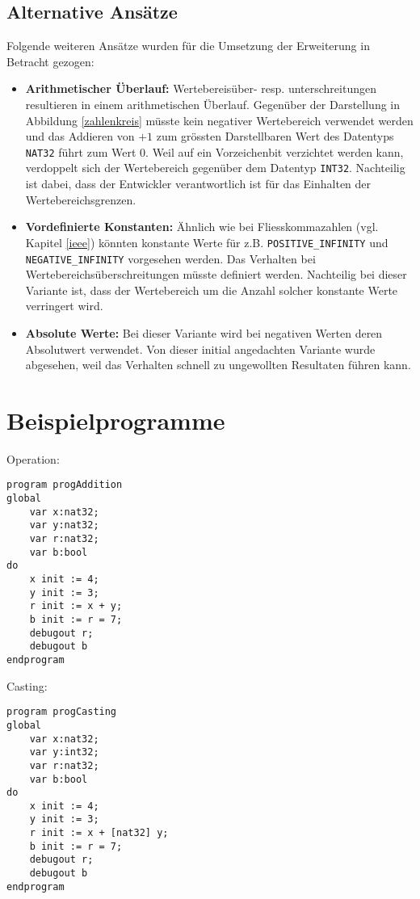 \documentclass[10pt, a4paper, twocolumn]{article} %
\begin{document}
\subsection{Alternative Ansätze}
Folgende weiteren Ansätze wurden für die Umsetzung der Erweiterung in Betracht gezogen:

\begin{itemize}
    \item \textbf{Arithmetischer Überlauf:} Wertebereisüber- resp. unterschreitungen resultieren in einem arithmetischen Überlauf. Gegenüber der Darstellung in Abbildung \ref{zahlenkreis} müsste kein negativer Wertebereich verwendet werden und das Addieren von $+ 1$ zum grössten Darstellbaren Wert des Datentyps \texttt{NAT32} führt zum Wert $0$. Weil auf ein Vorzeichenbit verzichtet werden kann, verdoppelt sich der Wertebereich gegenüber dem Datentyp \texttt{INT32}. Nachteilig ist dabei, dass der Entwickler verantwortlich ist für das Einhalten der Wertebereichsgrenzen.
    \item \textbf{Vordefinierte Konstanten:} Ähnlich wie bei Fliesskommazahlen (vgl. Kapitel \ref{ieee}) könnten konstante Werte für z.B. \texttt{POSITIVE\_INFINITY} und \texttt{NEGATIVE\_INFINITY} vorgesehen werden. Das Verhalten bei Wertebereichsüberschreitungen müsste definiert werden. Nachteilig bei dieser Variante ist, dass der Wertebereich um die Anzahl solcher konstante Werte verringert wird.
    \item \textbf{Absolute Werte:} Bei dieser Variante wird bei negativen Werten deren Absolutwert verwendet. Von dieser initial angedachten Variante wurde abgesehen, weil das Verhalten schnell zu ungewollten Resultaten führen kann.
\end{itemize}

\section{Beispielprogramme}
\label{sec:prog}
Operation:
\begin{lstlisting}
program progAddition
global
    var x:nat32;
    var y:nat32;
    var r:nat32;
    var b:bool
do
    x init := 4;
    y init := 3;
    r init := x + y;
    b init := r = 7;
    debugout r;
    debugout b
endprogram
\end{lstlisting}
Casting:
\begin{lstlisting}
program progCasting
global
    var x:nat32;
    var y:int32;
    var r:nat32;
    var b:bool
do
    x init := 4;
    y init := 3;
    r init := x + [nat32] y;
    b init := r = 7;
    debugout r;
    debugout b
endprogram
\end{lstlisting}
\end{document}
